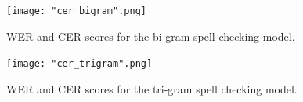 \documentclass[11pt, a4paper]{article}
\begin{document}
	
	 \begin{figure}
	    \centering
	    \texttt{[image: "cer\_bigram".png]}
	    \caption{WER and CER scores for the bi-gram spell checking model.}
	    \label{fig::cer_bigram}
	\end{figure}
	
	
	 \begin{figure}
	    \centering
	    \texttt{[image: "cer\_trigram".png]}
	    \caption{WER and CER scores for the tri-gram spell checking model.}
	    \label{fig::cer_trigram}
	\end{figure}
	
	
\end{document}
